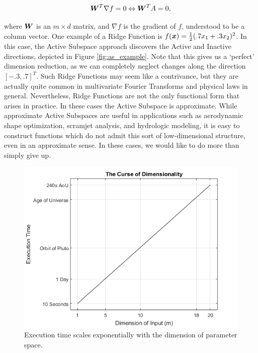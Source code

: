 \documentclass[]{aiaa-tc}%
\begin{document}
\begin{equation}
\boldsymbol{W}^T\nabla f = 0 \Leftrightarrow \boldsymbol{W}^TA = 0, \label{eq:ridge_property}
\end{equation}

where $\boldsymbol{W}$ is an $m\times d$ matrix, and $\nabla f$ is the gradient of $f$, understood to be a column vector. One example of a Ridge Function is $f(\boldsymbol{x}) = \frac{1}{2}(.7x_1+.3x_2)^2$. In this case, the Active Subspace approach discovers the Active and Inactive directions, depicted in Figure \ref{fig:as_example}. Note that this gives us a `perfect' dimension reduction, as we can completely neglect changes along the direction $[-.3,.7]^T$. Such Ridge Functions may seem like a contrivance, but they are actually quite common in multivariate Fourier Transforms\cite{pinkus2015} and physical laws in general.\cite{Constantine2016} Nevertheless, Ridge Functions are not the only functional form that arises in practice. In these cases the Active Subspace is approximate. While approximate Active Subspaces are useful in applications such as aerodynamic shape optimization\cite{lukaczyk2014}, scramjet analysis\cite{Constantine20151}, and hydrologic modeling\cite{Jefferson2015}, it is easy to construct functions which do not admit this sort of low-dimensional structure, even in an approximate sense. In these cases, we would like to do more than simply give up.

\begin{figure}
 \includegraphics{../images/curse_of_dimensionality}
 \caption{Execution time scales exponentially with the dimension of parameter space.}
 \label{fig:curse_of_dimensionality}
\end{figure}
\end{document}
